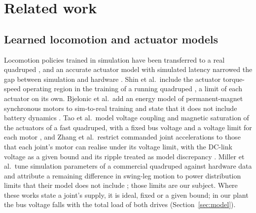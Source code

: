 \section{Related work}\label{sec:related}
\subsection{Learned locomotion and actuator models}\label{sec:rw-loco}
Locomotion policies trained in simulation have been transferred to a real quadruped \cite{hwangbo2019agile}, and an accurate actuator model with simulated latency narrowed the gap between simulation and hardware \cite{tan2018simtoreal}. Shin et al.\ include the actuator torque-speed operating region in the training of a running quadruped \cite{shin2023actuator}, a limit of each actuator on its own. Bjelonic et al.\ add an energy model of permanent-magnet synchronous motors to sim-to-real training and state that it does not include battery dynamics \cite{bjelonic2026pace}. Tao et al.\ model voltage coupling and magnetic saturation of the actuators of a fast quadruped, with a fixed bus voltage and a voltage limit for each motor \cite{tao2026actuator}, and Zhang et al.\ restrict commanded joint accelerations to those that each joint's motor can realise under its voltage limit, with the DC-link voltage as a given bound and its ripple treated as model discrepancy \cite{zhang2026vra}. Miller et al.\ tune simulation parameters of a commercial quadruped against hardware data and attribute a remaining difference in swing-leg motion to power distribution limits that their model does not include \cite{miller2025spot}; those limits are our subject. Where these works state a joint's supply, it is ideal, fixed or a given bound; in our plant the bus voltage falls with the total load of both drives (Section~\ref{sec:model}).

